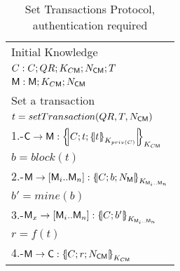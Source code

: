 \begin{table}[htb]
\footnotesize
\begin{center}
\caption{Set Transactions Protocol, authentication required}
\label{table:ProtSetTrans}
\begin{tabular}{|l|}
\hline
           Initial Knowledge                                                             \\
            $C:C; QR ;  K_{C\textsf{M}} ; N_{\textsf{C}\textsf{M}} ; T$               \\
            $\textsf{M}: \textsf{M}; K_{C\textsf{M}} ; N_{\textsf{C}\textsf{M}}$    \\ \hline \hline 
           Set a transaction                                                                        \\
           \hspace{5mm} $t=setTransaction(QR,T,N_{\textsf{C}\textsf{M}})$                                  \\  
           1.-$\Client\rightarrow \Server: \fat{C \lnk t \lnk \fat{t}_{K_{priv(C)}}}_{K_{C\Server}}$          \\ 
           \hspace{5mm} $b=block(t)$                                  \\  
           2.-$\Server\rightarrow [\Server_i .. \Server_n]: \fat{C \lnk b \lnk N_\Server}_{K_{\Server_i .. \Server_n}}$          \\ 
           \hspace{5mm} $b'=mine(b)$                                  \\  
           3.-$\Server_x\rightarrow [\Server_i .. \Server_n]: \fat{C \lnk b'}_{K_{\Server_i .. \Server_n}}$          \\            
           \hspace{5mm} $r=f(t)$                                  \\  
           4.-$\Server\rightarrow \Client: \fat{C \lnk r \lnk N_{\Client\Server}}_{K_{C\Server}}$       \\  \hline \hline
\end{tabular}
\end{center}
\end{table}
\normalsize
